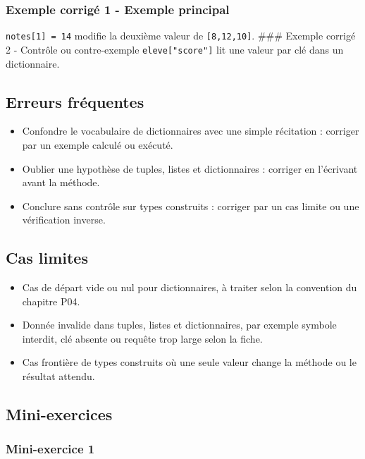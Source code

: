\subsubsection{Exemple corrigé 1 - Exemple principal}

\texttt{notes{[}1{]}\ =\ 14} modifie la deuxième valeur de
\texttt{{[}8,12,10{]}}. \#\#\# Exemple corrigé 2 - Contrôle ou
contre-exemple \lstinline|eleve["score"]| lit une valeur par clé dans
un dictionnaire.

\subsection{Erreurs fréquentes}

\begin{itemize}
\tightlist
\item
  Confondre le vocabulaire de dictionnaires avec une simple récitation :
  corriger par un exemple calculé ou exécuté.
\item
  Oublier une hypothèse de tuples, listes et dictionnaires : corriger en
  l'écrivant avant la méthode.
\item
  Conclure sans contrôle sur types construits : corriger par un cas
  limite ou une vérification inverse.
\end{itemize}

\subsection{Cas limites}

\begin{itemize}
\tightlist
\item
  Cas de départ vide ou nul pour dictionnaires, à traiter selon la
  convention du chapitre P04.
\item
  Donnée invalide dans tuples, listes et dictionnaires, par exemple
  symbole interdit, clé absente ou requête trop large selon la fiche.
\item
  Cas frontière de types construits où une seule valeur change la
  méthode ou le résultat attendu.
\end{itemize}

\subsection{Mini-exercices}

\subsubsection{Mini-exercice 1}

